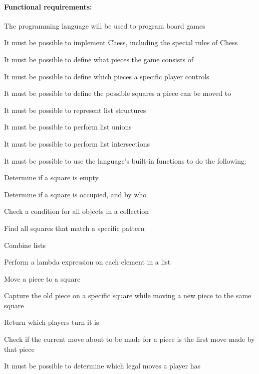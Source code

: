 \paragraph*{Functional requirements:}
\begin{nlist}
  \item The programming language will be used to program board games
  \begin{nlist}
    \item It must be possible to implement Chess, including the special rules of
      Chess
  \end{nlist}
  \item It must be possible to define what pieces the game consists of
  \item It must be possible to define which pieces a specific player controls
  \item It must be possible to define the possible squares a piece can be moved
    to
  \item It must be possible to represent list structures
  \begin{nlist}
    \item It must be possible to perform list unions
    \item It must be possible to perform list intersections
  \end{nlist}
  \item It must be possible to use the language's built-in functions to do the
    following:
  \begin{nlist}
    \item Determine if a square is empty
    \item Determine if a square is occupied, and by who
    \item Check a condition for all objects in a collection
    \item Find all squares that match a specific pattern
    \item Combine lists
    \item Perform a lambda expression on each element in a list
    \item Move a piece to a square
    \item Capture the old piece on a specific square while moving a new piece to
      the same square
    \item Return which players turn it is
    \item Check if the current move about to be made for a piece is the first
      move made by that piece
  \end{nlist}
  \item It must be possible to determine which legal moves a player has

\end{nlist}
